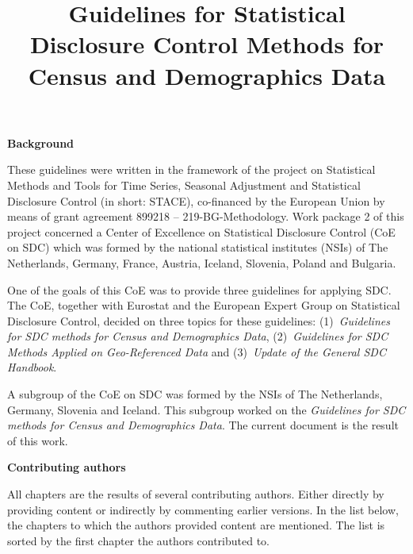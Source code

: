 \documentclass[openany,oneside]{book}
\title{Guidelines for Statistical Disclosure Control Methods for Census and Demographics Data}
\author{}
\date{}
\begin{document}


\thispagestyle{empty}
\noindent \textbf{\large Background}\bigskip

\noindent These guidelines were written in the framework of the project on Statistical Methods and Tools for Time Series, Seasonal Adjustment and Statistical Disclosure Control (in short: STACE), co-financed by the European Union by means of grant agreement 899218 -- 219-BG-Methodology. Work package 2 of this project concerned a Center of Excellence on Statistical Disclosure Control (CoE on SDC) which was formed by the national statistical institutes (NSIs) of The Netherlands, Germany, France, Austria, Iceland, Slovenia, Poland and Bulgaria.

One of the goals of this CoE was to provide three guidelines for applying SDC. The CoE, together with Eurostat and the European Expert Group on Statistical Disclosure Control, decided on three topics for these guidelines: (1)~\textit{Guidelines for SDC methods for Census and Demographics Data}, (2)~\textit{Guidelines for SDC Methods Applied on Geo-Referenced Data} and (3)~\textit{Update of the General SDC Handbook}.

A subgroup of the CoE on SDC was formed by the NSIs of The Netherlands, Germany, Slovenia and Iceland. This subgroup worked on the \textit{Guidelines for SDC methods for Census and Demographics Data}. The current document is the result of this work.

\maketitle
\thispagestyle{empty}

\noindent \textbf{\large Contributing authors}\bigskip

\noindent All chapters are the results of several contributing authors. Either directly by providing content or indirectly by commenting earlier versions. In the list below, the chapters to which the authors provided content are mentioned. The list is sorted by the first chapter the authors contributed to.
\bigskip
\end{document}
